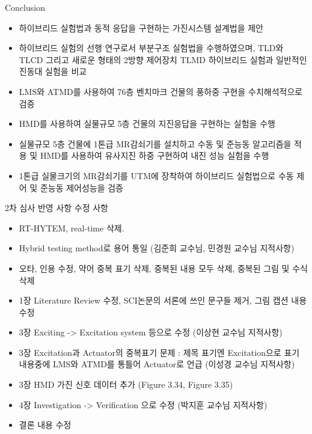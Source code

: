 \documentclass[usepdftitle=false]{beamer}
\begin{document}
\begin{frame}{Conclusion}
\begin{itemize}
   \item 하이브리드 실험법과 동적 응답을 구현하는 가진시스템 설계법을 제안
   \item 하이브리드 실험의 선행 연구로서 부분구조 실험법을 수행하였으며, TLD와 TLCD 그리고 새로운 형태의 2방향 제어장치 TLMD 하이브리드 실험과 일반적인 진동대 실험을 비교
   \item LMS와 ATMD를 사용하여 76층 벤치마크 건물의 풍하중 구현을 수치해석적으로 검증
   \item HMD를 사용하여 실물규모 5층 건물의 지진응답을 구현하는 실험을 수행
   \item 실물규모 5층 건물에 1톤급 MR감쇠기를 설치하고 수동 및 준능동 알고리즘을 적용 및 HMD를 사용하여 유사지진 하중 구현하여 내진 성능 실험을 수행
   \item 1톤급 실물크기의 MR감쇠기를 UTM에 장착하여 하이브리드 실험법으로 수동 제어 및 준능동 제어성능을 검증
\end{itemize}
\end{frame}



\begin{frame}{2차 심사 반영 사항 수정 사항}
\begin{itemize}
   \item RT-HYTEM, real-time 삭제.
   \item Hybrid testing method로 용어 통일 (김준희 교수님, 민경원 교수님 지적사항)
   \item 오타, 인용 수정, 약어 중복 표기 삭제, 중복된 내용 모두 삭제, 중복된 그림 및 수식 삭제
   \item 1장 Literature Review 수정, SCI논문의 서론에 쓰인 문구들 제거, 그림 캡션 내용 수정
   \item 3장 Exciting -> Excitation system 등으로 수정 (이상현 교수님 지적사항)
   \item 3장 Excitation과 Actuator의 중복표기 문제 : 제목 표기엔 Excitation으로 표기 내용중에 LMS와 ATMD를 통틀어 Actuator로 언급 (이성경 교수님 지적사항)
   \item 3장 HMD 가진 신호 데이터 추가 (Figure 3.34, Figure 3.35)
   \item 4장 Investigation -> Verification 으로 수정 (박지훈 교수님 지적사항)
   \item 결론 내용 수정
\end{itemize}
\end{frame}
\end{document}
